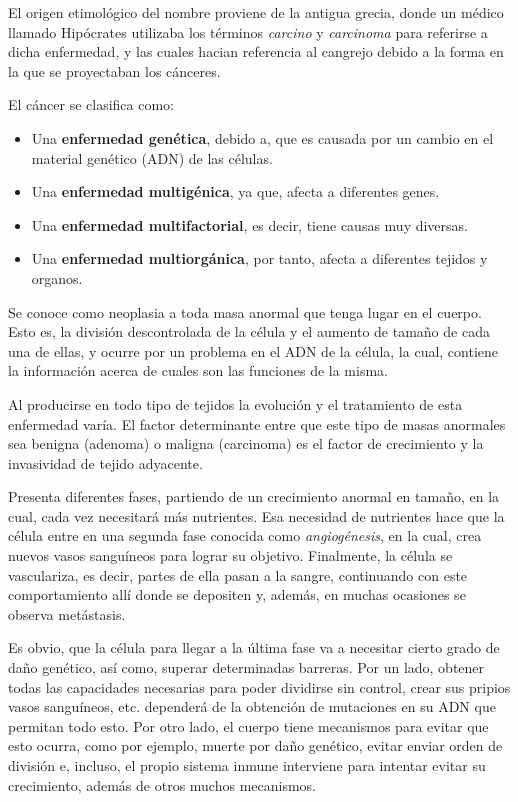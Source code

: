 El origen etimológico del nombre proviene de la antigua grecia, donde un médico llamado
Hipócrates utilizaba los términos \textit{carcino} y \textit{carcinoma} para referirse
a dicha enfermedad, y las cuales hacian referencia al cangrejo debido a la forma en la
que se proyectaban los cánceres.

El cáncer se clasifica como:

\begin{itemize}
    \item Una \textbf{enfermedad genética}, debido a, que es causada por un cambio en el
    material genético (ADN) de las células.
    \item Una \textbf{enfermedad multigénica}, ya que, afecta a diferentes genes.
    \item Una \textbf{enfermedad multifactorial}, es decir, tiene causas muy diversas.
    \item Una \textbf{enfermedad multiorgánica}, por tanto, afecta a diferentes tejidos y organos.
\end{itemize}

Se conoce como neoplasia a toda masa anormal que tenga lugar en el cuerpo. Esto es, la división
descontrolada de la célula y el aumento de tamaño de cada una de ellas, y ocurre
por un problema en el ADN de la célula, la cual, contiene la información acerca de cuales son
las funciones de la misma.

Al producirse en todo tipo de tejidos la evolución y el tratamiento de esta enfermedad varía.
El factor determinante entre que este tipo de masas anormales sea benigna (adenoma)
o maligna (carcinoma) es el factor de crecimiento y la invasividad de tejido adyacente.

Presenta diferentes fases, partiendo de un crecimiento anormal en tamaño, en la cual,
cada vez necesitará más nutrientes. Esa necesidad de nutrientes hace que la célula entre en
una segunda fase conocida como \textit{angiogénesis}, en la cual, crea nuevos vasos sanguíneos
para lograr su objetivo. Finalmente, la célula se vasculariza, es decir, partes de ella pasan
a la sangre, continuando con este comportamiento allí donde se depositen y, además, en muchas
ocasiones se observa metástasis.

Es obvio, que la célula para llegar a la última fase va a necesitar cierto grado de daño genético,
así como, superar determinadas barreras. Por un lado, obtener todas las capacidades necesarias para
poder dividirse sin control, crear sus pripios vasos sanguíneos, etc. dependerá de la obtención
de mutaciones en su ADN que permitan todo esto. Por otro lado, el cuerpo tiene mecanismos para evitar
que esto ocurra, como por ejemplo, muerte por daño genético, evitar enviar orden de división e, incluso,
el propio sistema inmune interviene para intentar evitar su crecimiento, además de otros muchos mecanismos.

